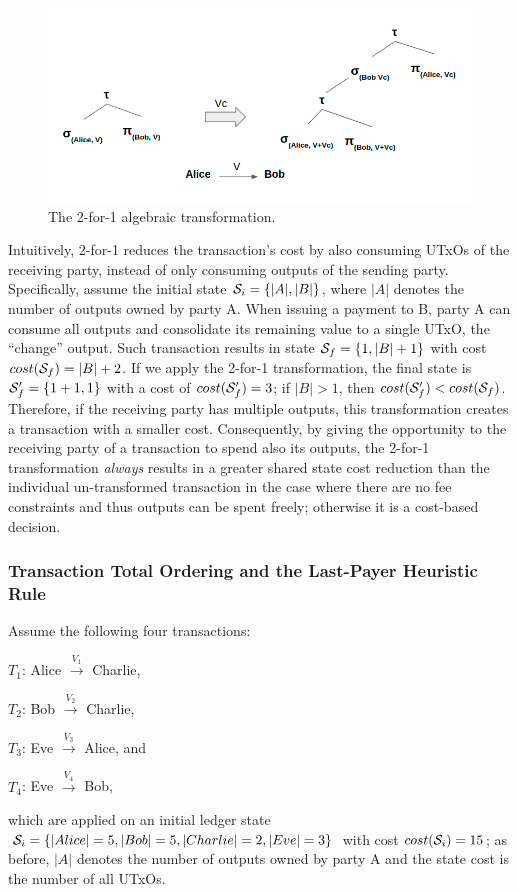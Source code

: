 \begin{figure}[h!]
	\centering
	\includegraphics[width=0.9\columnwidth,keepaspectratio]{figures/utxo_growth/2-for-1.png}
	\caption{The 2-for-1 algebraic transformation.}
	\label{fig:2-for-1}
\end{figure}

Intuitively, 2-for-1 reduces the transaction's cost by also consuming UTxOs of
the receiving party, instead of only consuming outputs of the sending party.
Specifically, assume the initial state $\mathcal{S}_i = \{|A|, |B|\}$, where
$|A|$ denotes the number of outputs owned by party A. When issuing a payment to
B, party A can consume all outputs and consolidate its remaining value to a
single UTxO, the ``change'' output. Such transaction results in state
$\mathcal{S}_f = \{1, |B|+1 \}$ with cost $cost(\mathcal{S}_f) = |B|+2$.
If we apply the 2-for-1 transformation, the final state is $\mathcal{S}_f' =
\{1+1, 1\}$ with a cost of $cost(\mathcal{S}_f') = 3$; if $|B| > 1$, then
$cost(\mathcal{S}_f') < cost (\mathcal{S}_f)$.  Therefore, if the receiving
party has multiple outputs, this transformation creates a transaction with a
smaller cost. Consequently, by giving the opportunity to the receiving party of
a transaction to spend also its outputs, the 2-for-1 transformation
\emph{always} results in a greater shared state cost reduction than the
individual un-transformed transaction in the case where there are no fee
constraints and thus outputs can be spent freely; otherwise it is a cost-based
decision.

\subsubsection{Transaction Total Ordering and the Last-Payer Heuristic Rule}

Assume the following four transactions:
\begin{inparaenum}[(1)]
    \item $T_1$: Alice $\xrightarrow{V_1}$ Charlie,
    \item $T_2$: Bob $\xrightarrow{V_2}$ Charlie,
    \item $T_3$: Eve $\xrightarrow{V_3}$ Alice, and
    \item $T_4$: Eve $\xrightarrow{V_4}$ Bob,
\end{inparaenum}
which are applied on an initial ledger state $\mathcal{S}_i = \{|Alice| = 5,
|Bob| = 5, |Charlie| = 2, |Eve| = 3\}$ with cost $cost (\mathcal{S}_i) = 15$;
as before, $|A|$ denotes the number of outputs owned by party A and the state
cost is the number of all UTxOs.

